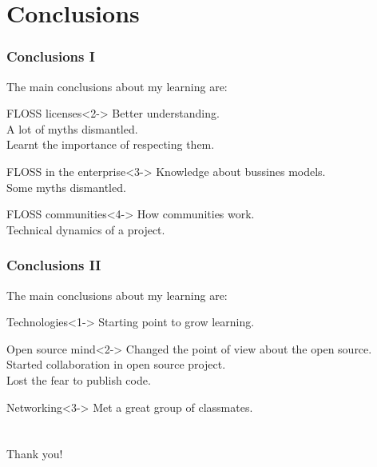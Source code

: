 \documentclass[slidestop,compress,mathserif]{beamer}
\begin{document}
\section{Conclusions}
\begin{frame}
  \frametitle{Conclusions I}

  The main conclusions about my learning are:
  
  \begin{block}{FLOSS licenses}<2->
    Better understanding.\\
    A lot of myths dismantled.\\
    Learnt the importance of respecting them.
  \end{block}

  \begin{block}{FLOSS in the enterprise}<3->
    Knowledge about bussines models.\\
    Some myths dismantled.
  \end{block}

  \begin{block}{FLOSS communities}<4->
    How communities work.\\
    Technical dynamics of a project.
  \end{block}
\end{frame}

\begin{frame}
  \frametitle{Conclusions II}

  The main conclusions about my learning are:
  
  \begin{block}{Technologies}<1->
    Starting point to grow learning.
  \end{block}

  \begin{block}{Open source mind}<2->
    Changed the point of view about the open source.\\
    Started collaboration in open source project.\\
    Lost the fear to publish code.
  \end{block}

  \begin{block}{Networking}<3->
    Met a great group of classmates.
  \end{block}
\end{frame}

\section{}
\begin{frame}
  \vspace*{\fill}
  \begin{center}
    {\Huge Thank you!}
  \end{center}
\end{frame}
\end{document}
